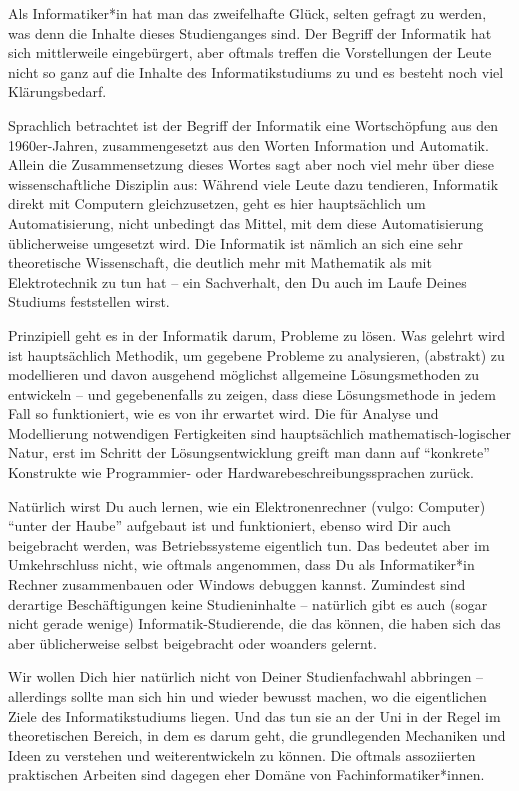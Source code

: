 {Als Informatiker*in hat man das zweifelhafte Glück, selten gefragt zu werden, was denn die Inhalte dieses Studienganges sind. Der Begriff der Informatik hat sich mittlerweile eingebürgert, aber oftmals treffen die Vorstellungen der Leute nicht so ganz auf die Inhalte des Informatikstudiums zu und es besteht noch viel Klärungsbedarf.
}
{Sprachlich betrachtet ist der Begriff der Informatik eine Wortschöpfung aus den 1960er-Jahren, zusammengesetzt aus den Worten Information und Automatik. Allein die Zusammensetzung dieses Wortes sagt aber noch viel mehr über diese wissenschaftliche Disziplin aus: Während viele Leute dazu tendieren, Informatik direkt mit Computern gleichzusetzen, geht es hier hauptsächlich um Automatisierung, nicht unbedingt das Mittel, mit dem diese Automatisierung üblicherweise umgesetzt wird. Die Informatik ist nämlich an sich eine sehr theoretische Wissenschaft, die deutlich mehr mit Mathematik als mit Elektrotechnik zu tun hat – ein Sachverhalt, den Du auch im Laufe Deines Studiums feststellen wirst.

    Prinzipiell geht es in der Informatik darum, Probleme zu lösen. Was gelehrt wird ist hauptsächlich Methodik, um gegebene Probleme zu analysieren, (abstrakt) zu modellieren und davon ausgehend möglichst allgemeine Lösungsmethoden zu entwickeln – und gegebenenfalls zu zeigen, dass diese Lösungsmethode in jedem Fall so funktioniert, wie es von ihr erwartet wird. Die für Analyse und Modellierung notwendigen Fertigkeiten sind hauptsächlich mathematisch-logischer Natur, erst im Schritt der Lösungsentwicklung greift man dann auf "`konkrete"' Konstrukte wie Programmier- oder Hardwarebeschreibungssprachen zurück.

    Natürlich wirst Du auch lernen, wie ein Elektronenrechner (vulgo: Computer) "`unter der Haube"' aufgebaut ist und funktioniert, ebenso wird Dir auch beigebracht werden, was Betriebssysteme eigentlich tun. Das bedeutet aber im Umkehrschluss nicht, wie oftmals angenommen, dass Du als Informatiker*in Rechner zusammenbauen oder Windows debuggen kannst. Zumindest sind derartige Beschäftigungen keine Studieninhalte – natürlich gibt es auch (sogar nicht gerade wenige) Informatik-Studierende, die das können, die haben sich das aber üblicherweise selbst beigebracht oder woanders gelernt.

    Wir wollen Dich hier natürlich nicht von Deiner Studienfachwahl abbringen – allerdings sollte man sich hin und wieder bewusst machen, wo die eigentlichen Ziele des Informatikstudiums liegen. Und das tun sie an der Uni in der Regel im theoretischen Bereich, in dem es darum geht, die grundlegenden Mechaniken und Ideen zu verstehen und weiterentwickeln zu können. Die oftmals assoziierten praktischen Arbeiten sind dagegen eher Domäne von Fachinformatiker*innen.
}
{}

\vfill
{}

\newpage
